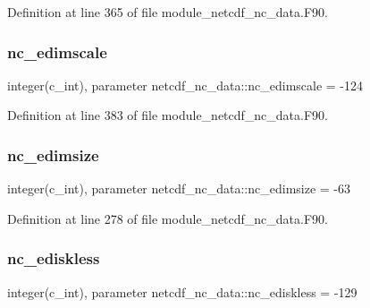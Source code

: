 Definition at line 365 of file module\+\_\+netcdf\+\_\+nc\+\_\+data.\+F90.

\mbox{\label{namespacenetcdf__nc__data_acbc771537293b7ab5f9c447c67228eb4}} 
\subsubsection{\texorpdfstring{nc\+\_\+edimscale}{nc\_edimscale}}
{\footnotesize\ttfamily integer(c\+\_\+int), parameter netcdf\+\_\+nc\+\_\+data\+::nc\+\_\+edimscale = -\/124}



Definition at line 383 of file module\+\_\+netcdf\+\_\+nc\+\_\+data.\+F90.

\mbox{\label{namespacenetcdf__nc__data_a00bc858d354d8005d17b50e0634119cd}} 
\subsubsection{\texorpdfstring{nc\+\_\+edimsize}{nc\_edimsize}}
{\footnotesize\ttfamily integer(c\+\_\+int), parameter netcdf\+\_\+nc\+\_\+data\+::nc\+\_\+edimsize = -\/63}



Definition at line 278 of file module\+\_\+netcdf\+\_\+nc\+\_\+data.\+F90.

\mbox{\label{namespacenetcdf__nc__data_a063068501e779d1d67f86a807a0bce79}} 
\subsubsection{\texorpdfstring{nc\+\_\+ediskless}{nc\_ediskless}}
{\footnotesize\ttfamily integer(c\+\_\+int), parameter netcdf\+\_\+nc\+\_\+data\+::nc\+\_\+ediskless = -\/129}



